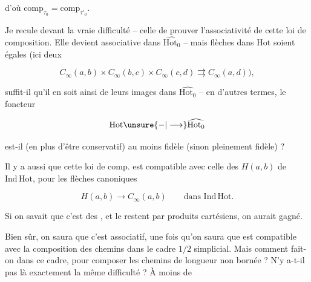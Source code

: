 
d'où $\mathrm{comp}_{\tau_0}=\mathrm{comp}_{\tau'_0}$.

Je recule devant la vraie difficulté -- celle de prouver l'associativité de cette loi de composition. Elle devient associative dans $\widehat{\mathrm{Hot}_0}$ -- mais   flèches dans $\mathrm{Hot}$ soient égales (ici deux  

\[
C_\infty(a,b)\times C_\infty(b,c)\times C_\infty(c,d)\rightrightarrows C_\infty(a,d)),
\]

suffit-il qu'il en soit ainsi de leurs images dans $\widehat{\mathrm{Hot}_0}$ -- en d'autres termes, le foncteur

\[
\mathrm{Hot}\unsure{-|\longrightarrow}\widehat{\mathrm{Hot}_0}
\]

est-il (en plus d'être conservatif) au moins fidèle (sinon pleinement fidèle) ?

Il y a aussi que cette loi de comp. est compatible avec celle des $H(a,b)$ de $\mathrm{Ind\,Hot}$, pour les flèches canoniques

\[
H(a,b)\longrightarrow C_\infty(a,b)\qquad\text{dans }\mathrm{Ind\,Hot}.
\]

Si on savait que c'est des , et le restent par produits cartésiens, on aurait gagné.

Bien sûr,  on saura que c'est associatif, une fois qu'on saura que  est compatible avec la composition des chemins dans le cadre $1/2$ simplicial. Mais comment fait-on dans ce cadre, pour composer les chemins de longueur  non bornée ? N'y a-t-il pas là exactement la même difficulté ? À moins de 

